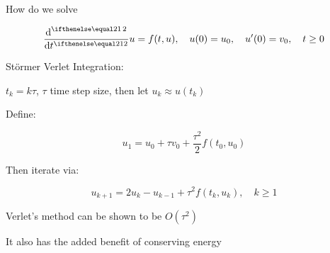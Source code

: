 How do we solve

$$\der[2]{}{t} u = f(t,u), \quad u(0) = u_0, \quad u'(0) = v_0, \quad t \geq 0$$

St\"ormer Verlet Integration:

$t_k = k\tau$, $\tau$ time step size, then let $u_k \approx u(t_k)$

Define:

$$u_1 = u_0 + \tau v_0 + \frac{\tau^2}{2} f(t_0,u_0)$$

Then iterate via:

$$u_{k+1} = 2u_{k} - u_{k-1} + \tau^2 f(t_k,u_k), \quad k \geq 1$$

Verlet's method can be shown to be $O(\tau^2)$ \cite{md-verlet}

It also has the added benefit of conserving energy
